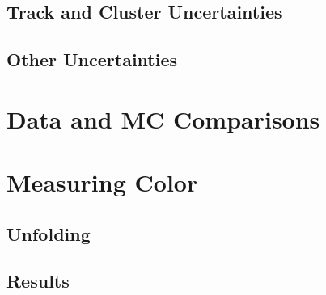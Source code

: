 	\subsection{Track and Cluster Uncertainties}
	\subsection{Other Uncertainties}
\section{Data and MC Comparisons}
\section{Measuring Color}
	\subsection{Unfolding}
	\subsection{Results}
		